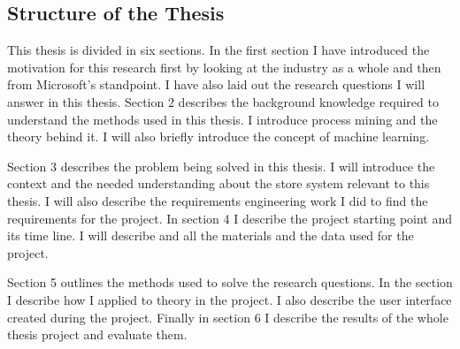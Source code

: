 \subsection{Structure of the Thesis}
This thesis is divided in six sections. In the first section I have introduced the motivation for this research first by looking at the industry as a whole and then from Microsoft's standpoint.
I have also laid out the research questions I will answer in this thesis.
Section 2 describes the background knowledge required to understand the methods used in this thesis.
I introduce process mining and the theory behind it. I will also briefly introduce the concept of machine learning.

Section 3 describes the problem being solved in this thesis. I will introduce the context and the needed understanding about the store system relevant to this thesis. I will also describe the requirements engineering work I did to find the requirements for the project.
In section 4 I describe the project starting point and its time line.
I will describe and all the materials and the data used for the project.

Section 5 outlines the methods used to solve the research questions.
In the section I describe how I applied to theory in the project.
I also describe the user interface created during the project.
Finally in section 6 I describe the results of the whole thesis project and evaluate them.
